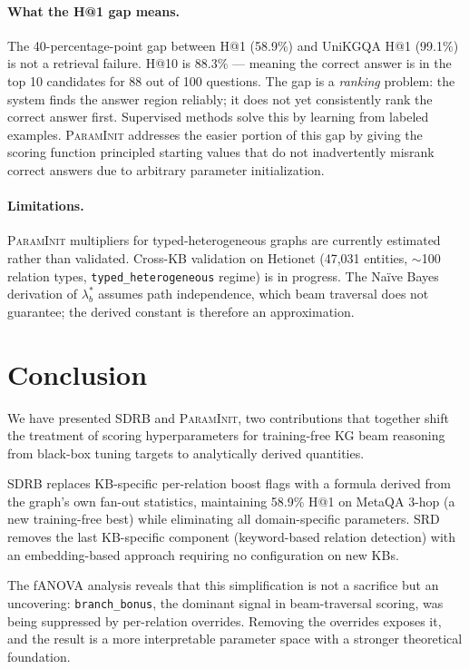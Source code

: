 \documentclass[10pt,twocolumn]{article}
\newcommand{\SDRB}{\textsc{SDRB}}
\newcommand{\SRD}{\textsc{SRD}}
\newcommand{\PI}{\textsc{ParamInit}}
\newcommand{\fanova}{f\textsc{ANOVA}}
\begin{document}
\paragraph{What the H@1 gap means.}
The 40-percentage-point gap between \CEREBRUM{} H@1 (58.9\%) and UniKGQA H@1
(99.1\%) is not a retrieval failure. \CEREBRUM{} H@10 is 88.3\% --- meaning the
correct answer is in the top 10 candidates for 88 out of 100 questions.
The gap is a \emph{ranking} problem: the system finds the answer region reliably;
it does not yet consistently rank the correct answer first. Supervised methods
solve this by learning from labeled examples. \PI{} addresses the easier portion
of this gap by giving the scoring function principled starting values that do not
inadvertently misrank correct answers due to arbitrary parameter initialization.

\paragraph{Limitations.}
\PI{} multipliers for typed-heterogeneous graphs are currently estimated rather
than validated. Cross-KB validation on Hetionet (47,031 entities, $\sim$100
relation types, \texttt{typed\_heterogeneous} regime) is in progress.
The Naïve Bayes derivation of $\lambda_b^*$ assumes path independence, which
beam traversal does not guarantee; the derived constant is therefore an
approximation.

\section{Conclusion}
\label{sec:conclusion}

We have presented \SDRB{} and \PI{}, two contributions that together shift
the treatment of scoring hyperparameters for training-free KG beam reasoning
from black-box tuning targets to analytically derived quantities.

\SDRB{} replaces KB-specific per-relation boost flags with a formula derived
from the graph's own fan-out statistics, maintaining 58.9\% H@1 on MetaQA
3-hop (a new training-free best) while eliminating all domain-specific parameters.
\SRD{} removes the last KB-specific component (keyword-based relation detection)
with an embedding-based approach requiring no configuration on new KBs.

The \fanova{} analysis reveals that this simplification is not a sacrifice
but an uncovering: \texttt{branch\_bonus}, the dominant signal in beam-traversal
scoring, was being suppressed by per-relation overrides. Removing the overrides
exposes it, and the result is a more interpretable parameter space with
a stronger theoretical foundation.
\end{document}
